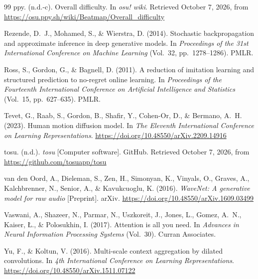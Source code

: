 \begin{thebibliography}{99}
ppy. (n.d.-c). Overall difficulty. In \emph{osu! wiki}. Retrieved October 7, 2026, from
\url{https://osu.ppy.sh/wiki/Beatmap/Overall_difficulty}

Rezende, D.~J., Mohamed, S., \& Wierstra, D. (2014). Stochastic backpropagation and approximate inference in deep
generative models. In \emph{Proceedings of the 31st International Conference on Machine Learning} (Vol.~32,
pp.~1278--1286). PMLR.

Ross, S., Gordon, G., \& Bagnell, D. (2011). A reduction of imitation learning and structured prediction to
no-regret online learning. In \emph{Proceedings of the Fourteenth International Conference on Artificial
Intelligence and Statistics} (Vol.~15, pp.~627--635). PMLR.

Tevet, G., Raab, S., Gordon, B., Shafir, Y., Cohen-Or, D., \& Bermano, A.~H. (2023). Human motion diffusion
model. In \emph{The Eleventh International Conference on Learning Representations}.
\url{https://doi.org/10.48550/arXiv.2209.14916}

tosu. (n.d.). \emph{tosu} [Computer software]. GitHub. Retrieved October 7, 2026, from
\url{https://github.com/tosuapp/tosu}

van den Oord, A., Dieleman, S., Zen, H., Simonyan, K., Vinyals, O., Graves, A., Kalchbrenner, N., Senior, A.,
\& Kavukcuoglu, K. (2016). \emph{WaveNet: A generative model for raw audio} [Preprint]. arXiv.
\url{https://doi.org/10.48550/arXiv.1609.03499}

Vaswani, A., Shazeer, N., Parmar, N., Uszkoreit, J., Jones, L., Gomez, A.~N., Kaiser, \L., \& Polosukhin, I.
(2017). Attention is all you need. In \emph{Advances in Neural Information Processing Systems} (Vol.~30).
Curran Associates.

Yu, F., \& Koltun, V. (2016). Multi-scale context aggregation by dilated convolutions. In \emph{4th
International Conference on Learning Representations}. \url{https://doi.org/10.48550/arXiv.1511.07122}

\end{thebibliography}
\endgroup
